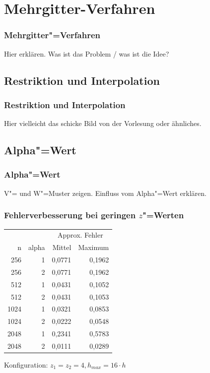 \documentclass{beamer}
\begin{document}
\section{Mehrgitter-Verfahren}
\begin{frame}
    \frametitle{Mehrgitter"=Verfahren}
    Hier erklären. Was ist das Problem / was ist die Idee?
\end{frame}

\subsection{Restriktion und Interpolation}
\begin{frame}
    \frametitle{Restriktion und Interpolation}
    Hier vielleicht das schicke Bild von der Vorlesung oder ähnliches.
\end{frame}

\subsection{Alpha"=Wert} %
\begin{frame}
    \frametitle{Alpha"=Wert}
    V"= und W"=Muster zeigen. Einfluss vom Alpha"=Wert erklären.
\end{frame}

\begin{frame}
    \frametitle{Fehlerverbesserung bei geringen \(z\)"=Werten}
    \begin{center}
    \begin{tabular}{|r|r|r|r|} \hline
    & & \multicolumn{2}{c|}{Approx. Fehler} \\
    n    & alpha & Mittel & Maximum \\ \hline \hline
    256  & 1     & 0,0771 & 0,1962  \\
    256  & 2     & 0,0771 & 0,1962  \\
    512  & 1     & 0,0431 & 0,1052  \\
    512  & 2     & 0,0431 & 0,1053  \\
    1024 & 1     & 0,0321 & 0,0853  \\
    1024 & 2     & 0,0222 & 0,0548  \\
    2048 & 1     & 0,2341 & 0,5783  \\
    2048 & 2     & 0,0111 & 0,0289  \\ \hline
    \end{tabular}
    \end{center}
    Konfiguration: \(z_1 = z_2 = 4, h_{max} = 16 \cdot h\)
\end{frame}
\end{document}
